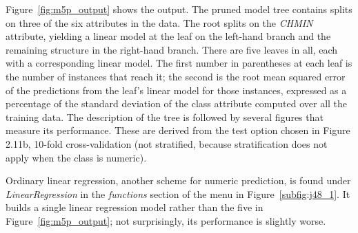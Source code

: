 Figure~\ref{fig:m5p_output} shows the output. The pruned model tree
contains splits on three of the six attributes in the data. The root
splits on the \textit{CHMIN} attribute, yielding a linear model at the
leaf on the left-hand branch and the remaining structure in the
right-hand branch. There are five leaves in all, each with a
corresponding linear model. The first number in parentheses at each
leaf is the number of instances that reach it; the second is the root
mean squared error of the predictions from the leaf's linear model for
those instances, expressed as a percentage of the standard deviation
of the class attribute computed over all the training data. The
description of the tree is followed by several figures that measure
its performance. These are derived from the test option chosen in
Figure 2.11b, 10-fold cross-validation (not stratified, because
stratification does not apply when the class is numeric).

Ordinary linear regression, another scheme for numeric prediction, is
found under \textit{LinearRegression} in the {\em functions} section of the
menu in Figure~\ref{subfig:j48_1}. It builds a single linear
regression model rather than the five in Figure~\ref{fig:m5p_output};
not surprisingly, its performance is slightly worse.

